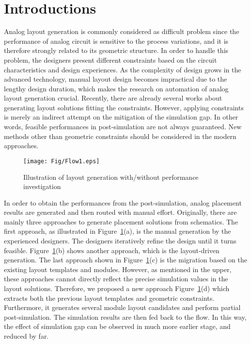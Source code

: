 \section{Introductions}\label{sec:intro}

Analog layout generation is commonly considered as difficult problem since the performance of analog circuit is sensitive to the process variations, and it is therefore strongly related to its geometric structure. In order to handle this problem, the designers present different constraints based on the circuit characteristics and design experiences. As the complexity of design grows in the advanced technology, manual layout design becomes impractical due to the lengthy design duration, which makes the research on automation of analog layout generation crucial. Recently, there are already several works about generating layout solutions fitting the constraints. However, applying constraints is merely an indirect attempt on the mitigation of the simulation gap. In other words, feasible performances in post-simulation are not always guaranteed. New methods other than geometric constraints should be considered in the modern approaches. 

\begin{figure}[ht]
    \begin{center}
    \texttt{[image: Fig/Flow1.eps]}
    \vspace{-1em}
    \caption{Illustration of layout generation with/without performance investigation} 
    \label{fig:Flow1}  
    \end{center}
    \vspace{-2em}
\end{figure}

In order to obtain the performances from the post-simulation, analog placement results are generated and then routed with manual effort. Originally, there are mainly three approaches to generate placement solutions from schematics. The first approach, as illustrated in Figure~\ref{fig:Flow1}(a), is the manual generation by the experienced designers. The designers iteratively refine the design until it turns feasible. Figure~\ref{fig:Flow1}(b) shows another approach, which is the layout-driven generation. The last approach shown in Figure~\ref{fig:Flow1}(c) is the migration based on the existing layout templates and modules. However, as mentioned in the upper, these approaches cannot directly reflect the 
precise simulation values in the layout solutions. Therefore, we proposed a new approach Figure~\ref{fig:Flow1}(d) which extracts both the previous layout templates and geometric constraints. Furthermore, it generates several module layout candidates and perform partial post-simulation. The simulation results are then fed back to the flow. In this way, the effect of simulation gap can be observed in much more earlier stage, and reduced by far. 

